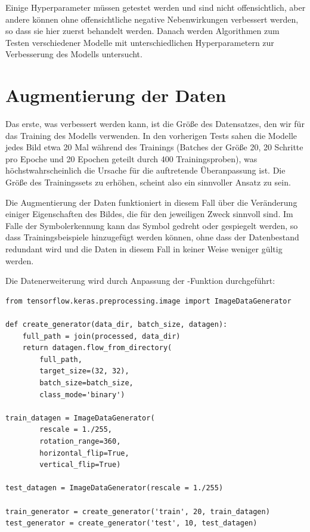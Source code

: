 Einige Hyperparameter müssen getestet werden und sind nicht offensichtlich, aber andere können ohne offensichtliche negative Nebenwirkungen verbessert werden, so dass sie hier zuerst behandelt werden. Danach werden Algorithmen zum Testen verschiedener Modelle mit unterschiedlichen Hyperparametern zur Verbesserung des Modells untersucht.

\section{Augmentierung der Daten} \label{ch:data_augmentation}

Das erste, was verbessert werden kann, ist die Größe des Datensatzes, den wir für das Training des Modells verwenden.
In den vorherigen Tests sahen die Modelle jedes Bild etwa 20 Mal während des Trainings (Batches der Größe 20, 20 Schritte pro Epoche und 20 Epochen geteilt durch 400 Trainingsproben), was höchstwahrscheinlich die Ursache für die auftretende Überanpassung ist.
Die Größe des Trainingssets zu erhöhen, scheint also ein sinnvoller Ansatz zu sein.

Die Augmentierung der Daten funktioniert in diesem Fall über die Veränderung einiger Eigenschaften des Bildes, die für den jeweiligen Zweck sinnvoll sind.
Im Falle der Symbolerkennung kann das Symbol gedreht oder gespiegelt werden, so dass Trainingsbeispiele hinzugefügt werden können, ohne dass der Datenbestand redundant wird und die Daten in diesem Fall in keiner Weise weniger gültig werden.

Die Datenerweiterung wird durch Anpassung der -Funktion durchgeführt:

\begin{lstlisting}
from tensorflow.keras.preprocessing.image import ImageDataGenerator

def create_generator(data_dir, batch_size, datagen):
    full_path = join(processed, data_dir)
    return datagen.flow_from_directory(
        full_path,
        target_size=(32, 32),
        batch_size=batch_size,
        class_mode='binary')

train_datagen = ImageDataGenerator(
        rescale = 1./255,
        rotation_range=360,
        horizontal_flip=True,
        vertical_flip=True)

test_datagen = ImageDataGenerator(rescale = 1./255)

train_generator = create_generator('train', 20, train_datagen)
test_generator = create_generator('test', 10, test_datagen)
\end{lstlisting}

